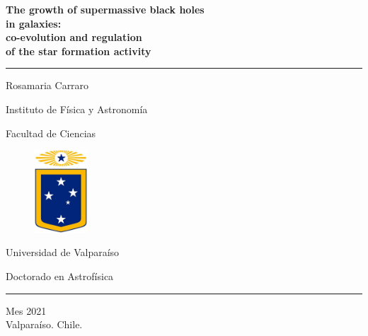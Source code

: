 \begin{titlepage}

\sffamily

\vspace{10mm}

\begin{centering}

{\huge \bfseries The growth of supermassive black holes \\in galaxies:}\\
\vspace{0.2cm}
{\huge \bf co-evolution and regulation \\of the star formation activity}

\vspace{2mm}

\noindent\rule{0.9\textwidth}{0.025truein}

\Large

\vspace{20mm}

{\sc Rosamaria Carraro}

\large

\vspace{15mm}
{Instituto de F\'isica y Astronom\'ia}

{Facultad de Ciencias}

\vspace{20mm}
\begin{figure}[h!]
\begin{center}
\includegraphics[width=2cm]{logo.jpeg}
\end{center}
\end{figure}
\vspace{10mm}

\large

{Universidad de Valpara\'iso}

{Doctorado en Astrof\'isica}

\vspace{10mm} \noindent\rule{1.5truein}{0.02truein}

{Mes 2021\\ Valpara\'iso. Chile.}

\end{centering}

\vfill

\end{titlepage}
\normalsize
